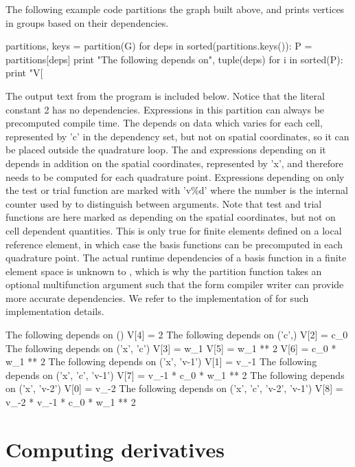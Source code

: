 The following example code partitions the graph built above, and prints
vertices in groups based on their dependencies.
\begin{python}
partitions, keys = partition(G)
for deps in sorted(partitions.keys()):
    P = partitions[deps]
    print "The following depends on", tuple(deps)
    for i in sorted(P):
        print "V[%
\end{python}
The output text from the program is included below.  Notice that the
literal constant 2 has no dependencies. Expressions in this partition can
always be precomputed compile time. The   depends
on data which varies for each cell, represented by 'c' in the dependency
set, but not on spatial coordinates, so it can be placed outside the
quadrature loop. The   and expressions depending
on it depends in addition on the spatial coordinates, represented by
'x', and therefore needs to be computed for each quadrature point.
Expressions depending on only the test or trial function are marked
with 'v\%d' where the number is the internal counter used by \ufl{} to
distinguish between arguments.  Note that test and trial functions are
here marked as depending on the spatial coordinates, but not on cell
dependent quantities. This is only true for finite elements defined
on a local reference element, in which case the basis functions can be
precomputed in each quadrature point.  The actual runtime dependencies
of a basis function in a finite element space is unknown to \ufl{},
which is why the partition function takes an optional multifunction
argument such that the form compiler writer can provide more accurate
dependencies. We refer to the implementation of  for such
implementation details.
\begin{gencode}
The following depends on ()
V[4] = 2
The following depends on ('c',)
V[2] = c_0
The following depends on ('x', 'c')
V[3] = w_1
V[5] = w_1 ** 2
V[6] = c_0 * w_1 ** 2
The following depends on ('x', 'v-1')
V[1] = v_{-1}
The following depends on ('x', 'c', 'v-1')
V[7] = v_{-1} * c_0 * w_1 ** 2
The following depends on ('x', 'v-2')
V[0] = v_{-2}
The following depends on ('x', 'c', 'v-2', 'v-1')
V[8] = v_{-2} * v_{-1} * c_0 * w_1 ** 2
\end{gencode}

\section{Computing derivatives} \label{ufl:sec:ad}

